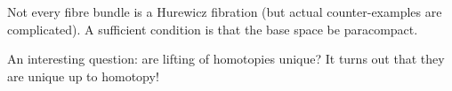\begin{remark}
Not every fibre bundle is a Hurewicz fibration (but actual counter-examples are complicated). A sufficient condition is that the base space be paracompact.
\end{remark}

\begin{remark}

An interesting question: are lifting of homotopies unique? It turns out that they are unique up to homotopy!
\begin{center}
    \qquad
\end{center}\normalmarginpar

\end{remark}
